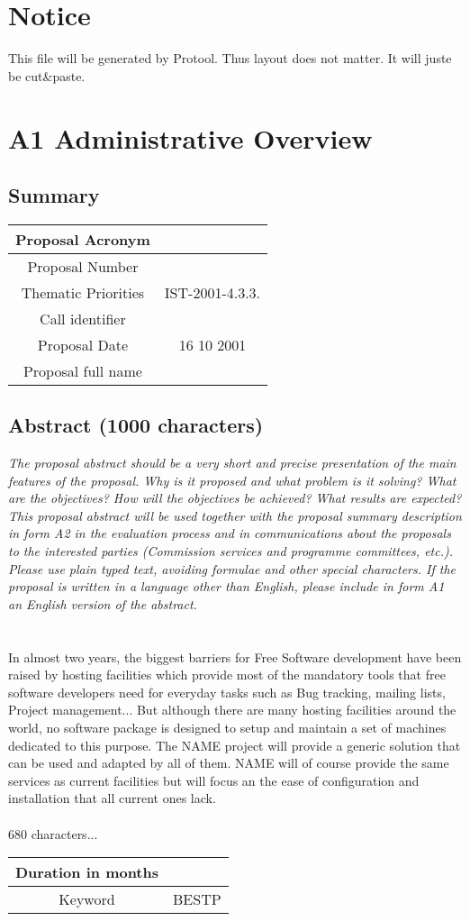 \documentclass[a4paper,11pt]{report}
\begin{document}
\section*{Notice}
This file will be generated by Protool. Thus layout does not matter. It will
juste be cut\&paste.
\section*{A1 Administrative Overview}
\subsection*{Summary}
\begin{tabular}{|c|c|}
\hline
Proposal Acronym &  \\ \hline
Proposal Number &  \\ \hline
Thematic Priorities & IST-2001-4.3.3. \\ \hline
Call identifier & \\ \hline
Proposal Date & 16 10 2001 \\ \hline
Proposal full name & \\ \hline
\end{tabular}
\subsection*{Abstract (1000 characters)}
\textit{The proposal abstract should be a very short and precise presentation
of the main features of the proposal. Why is it proposed and what problem is it
solving? What are the objectives? How will the objectives be achieved? What
results are expected? This proposal abstract will be used together with the
proposal summary description in form A2 in the evaluation process and in
communications about the proposals to the interested parties (Commission
services and programme committees, etc.). Please use plain typed text, avoiding
formulae and other special characters. If the proposal is written in a language
other than English, please include in form A1 an English version of the
abstract.} \\ \\ \\
In almost two years, the biggest barriers for Free Software development have
been raised by hosting facilities which provide most of the mandatory tools
that free software developers need for everyday tasks such as Bug tracking,
mailing lists, Project management... But although there are
many hosting facilities around the world, no software package is designed to
setup and maintain a set of machines dedicated to this purpose. The NAME
project will provide a generic solution that can be used and adapted by all of
them.
NAME will of course provide the same services as current facilities but
will focus an the ease of configuration and installation that all current ones
lack.
\\ \\ 
680 characters...
\begin{tabular}{|c|c|}
\hline
Duration in months & \\ \hline
Keyword & BESTP \\ \hline
\end{tabular}
\end{document}
